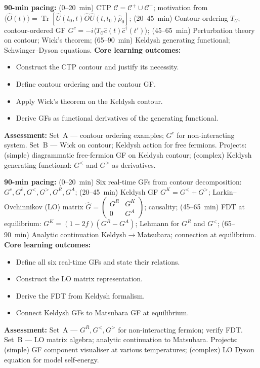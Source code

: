 \documentclass[11pt,a4paper]{article}
\begin{document}
\begin{tcolorbox}[modulebox, title={Module~II.5 / L02: The Keldysh Contour}]
\textbf{90-min pacing:} (0--20~min) CTP $\mathcal{C}=\mathcal{C}^+\cup\mathcal{C}^-$; motivation from $\langle\hat{O}(t)\rangle=\operatorname{Tr}[\hat{U}(t_0,t)\hat{O}\hat{U}(t,t_0)\hat\rho_0]$; (20--45~min) Contour-ordering $T_\mathcal{C}$; contour-ordered GF $G^c=-i\langle T_\mathcal{C}\hat{c}(t)\hat{c}^\dagger(t')\rangle$; (45--65~min) Perturbation theory on contour; Wick's theorem; (65--90~min) Keldysh generating functional; Schwinger--Dyson equations.
\medskip\textbf{Core learning outcomes:}
\begin{itemize}[leftmargin=1.4em,topsep=2pt,itemsep=1pt]
  \item Construct the CTP contour and justify its necessity.
  \item Define contour ordering and the contour GF.
  \item Apply Wick's theorem on the Keldysh contour.
  \item Derive GFs as functional derivatives of the generating functional.
\end{itemize}
\medskip\textbf{Assessment:}
Set~A --- contour ordering examples; $G^c$ for non-interacting system.
Set~B --- Wick on contour; Keldysh action for free fermions.
Projects: (simple) diagrammatic free-fermion GF on Keldysh contour; (complex) Keldysh generating functional: $G^<$ and $G^>$ as derivatives.
\end{tcolorbox}

\medskip

\begin{tcolorbox}[modulebox, title={Module~II.5 / L03: Contour-Ordered Green's Functions}]
\textbf{90-min pacing:} (0--20~min) Six real-time GFs from contour decomposition: $G^c,G^{\bar c},G^<,G^>,G^R,G^A$; (20--45~min) Keldysh GF $G^K=G^<+G^>$; Larkin--Ovchinnikov (LO) matrix $\hat{G}=\begin{pmatrix}G^R&G^K\\0&G^A\end{pmatrix}$; causality; (45--65~min) FDT at equilibrium: $G^K=(1-2f)(G^R-G^A)$; Lehmann for $G^R$ and $G^<$; (65--90~min) Analytic continuation Keldysh$\to$Matsubara; connection at equilibrium.
\medskip\textbf{Core learning outcomes:}
\begin{itemize}[leftmargin=1.4em,topsep=2pt,itemsep=1pt]
  \item Define all six real-time GFs and state their relations.
  \item Construct the LO matrix representation.
  \item Derive the FDT from Keldysh formalism.
  \item Connect Keldysh GFs to Matsubara GF at equilibrium.
\end{itemize}
\medskip\textbf{Assessment:}
Set~A --- $G^R,G^<,G^>$ for non-interacting fermion; verify FDT.
Set~B --- LO matrix algebra; analytic continuation to Matsubara.
Projects: (simple) GF component visualiser at various temperatures; (complex) LO Dyson equation for model self-energy.
\end{tcolorbox}
\end{document}

